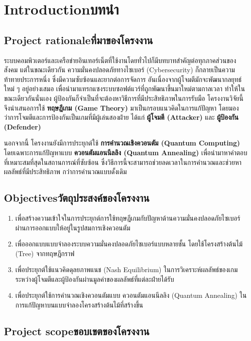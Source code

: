 \chapter{\ifenglish Introduction\else บทนำ\fi}

\section{\ifenglish Project rationale\else ที่มาของโครงงาน\fi}
ระบบคอมพิวเตอร์และเครือข่ายอินเทอร์เน็ตที่ใช้งานโดยทั่วไปก็มีบทบาทสำคัญต่อทุกภาคส่วนของสังคม 
แต่ในขณะเดียวกัน ความมั่นคงปลอดภัยทางไซเบอร์ (Cybersecurity) ก็กลายเป็นความท้าทายประการหนึ่ง 
ซึ่งมีความซับซ้อนและยากต่อการจัดการ อันเนื่องจากผู้โจมตีมักจะพัฒนากลยุทธ์ใหม่ ๆ อยู่อย่างเสมอ 
เพื่อนำมาแทรกแซงระบบซอฟต์แวร์ที่ถูกพัฒนาขึ้นมาใหม่ตามกาลเวลา 
ทำให้ในขณะเดียวกันนั่นเอง ผู้ป้องกันก็จำเป็นที่จะต้องหาวิธีการที่มีประสิทธิภาพในการรับมือ โครงงานวิจัยนี้จึงนำเสนอการใช้ \textbf{ทฤษฎีเกม (Game Theory)} 
มาเป็นกรอบแนวคิดในการแก้ปัญหา โดยมองว่าการโจมตีและการป้องกันเป็นเกมที่มีผู้เล่นสองฝ่าย ได้แก่ 
\textbf{ผู้โจมตี (Attacker)} และ \textbf{ผู้ป้องกัน (Defender)}  

นอกจากนี้ โครงงานยังมีการประยุกต์ใช้ \textbf{การคำนวณเชิงควอนตัม (Quantum Computing)} 
โดยเฉพาะการแก้ปัญหาแบบ \textbf{ควอนตัมแอนนีลลิง (Quantum Annealing)} 
เพื่อนำมาหาคำตอบที่เหมาะสมที่สุดในสถานการณ์ที่ซับซ้อน 
ซึ่งวิธีการนี้จะสามารถช่วยลดเวลาในการคำนวณและช่วยหาผลลัพธ์ที่มีประสิทธิภาพ 
กว่าการคำนวณแบบดั้งเดิม  
\section{\ifenglish Objectives\else วัตถุประสงค์ของโครงงาน\fi}
\begin{enumerate}
        \item เพื่อสร้างความเข้าใจในการประยุกต์การใช้ทฤษฎีเกมกับปัญหาด้านความมั่นคงปลอดภัยไซเบอร์ ผ่านการออกแบบให้อยู่ในรูปสมการเชิงควอนตัม
        \item เพื่อออกแบบแบบจำลองระบบความมั่นคงปลอดภัยไซเบอร์แบบหลายชั้น โดยใช้โครงสร้างต้นไม้ (Tree) 
        \enskip จากทฤษฎีกราฟ
        \item เพื่อประยุกต์ใช้แนวคิดดุลยภาพแนช (Nash Equilibrium) ในการวิเคราะห์ผลลัพธ์ของเกมระหว่างผู้โจมตีและผู้ป้องกันผ่านมูลค่าของผลลัพธ์ที่แต่ละฝ่ายได้รับ
        \item เพื่อประยุกต์ใช้การคำนวณเชิงควอนตัมแบบ ควอนตัมแอนนีลลิง (Quantum Annealing) ในการแก้ปัญหาบนแบบจำลองโครงสร้างต้นไม้ที่สร้างขึ้น
\end{enumerate}

\section{\ifenglish Project scope\else ขอบเขตของโครงงาน\fi}

